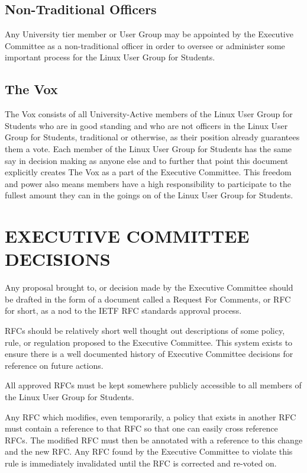 \documentclass[letter]{report}
\begin{document}
\section{Non-Traditional Officers}
Any University tier member or User Group may be appointed by the Executive
Committee as a non-traditional officer in order to oversee or administer some
important process for the Linux User Group for Students.

\section{The Vox}
The Vox consists of all University-Active members of the Linux User Group for Students who
are in good standing and who are not officers in the Linux User Group for Students,
traditional or otherwise, as their position already guarantees them a vote. Each
member of the Linux User Group for Students has the same say in decision making as anyone
else and to further that point this document explicitly creates The Vox as a
part of the Executive Committee. This freedom and power also means members have
a high responsibility to participate to the fullest amount they can in the
goings on of the Linux User Group for Students.


\chapter{EXECUTIVE COMMITTEE DECISIONS}
Any proposal brought to, or decision made by the Executive Committee should be
drafted in the form of a document called a Request For Comments, or RFC for
short, as a nod to the IETF RFC standards approval process.

RFCs should be relatively short well thought out descriptions of some policy,
rule, or regulation proposed to the Executive Committee. This system exists to
ensure there is a well documented history of Executive Committee decisions for
reference on future actions.

All approved RFCs must be kept somewhere publicly accessible to all members of
the Linux User Group for Students.

Any RFC which modifies, even temporarily, a policy that exists in another RFC
must contain a reference to that RFC so that one can easily cross reference
RFCs. The modified RFC must then be annotated with a reference to this change
and the new RFC. Any RFC found by the Executive Committee to violate this rule
is immediately invalidated until the RFC is corrected and re-voted on.
\end{document}
